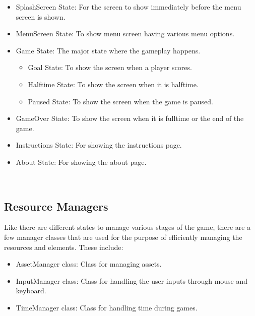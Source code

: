 \documentclass[main]{subfiles}
\begin{document}
\begin{itemize}
    \item SplashScreen State:
        For the screen to show immediately before the menu screen is shown.
    
    \item MenuScreen State:
        To show menu screen having various menu options.
    
    \item Game State:
        The major state where the gameplay happens.
        \begin{itemize}
            \item Goal State:
                To show the screen when a player scores.
                
            \item Halftime State:
                To show the screen when it is halftime.
            
            \item Paused State:
                To show the screen when the game is paused.
        \end{itemize}
    
    \item GameOver State:
        To show the screen when it is fulltime or the end of the game.
        
    \item Instructions State: 
        For showing the instructions page.
    
    \item About State:
        For showing the about page.
    
\end{itemize}\


\subsection{Resource Managers}
Like there are different states to manage various stages of the game, there are a few manager classes that are used for the purpose of efficiently managing the resources and elements. These include:
\begin{itemize}
    \item AssetManager class: 
        Class for managing assets.
 
    \item InputManager class: 
        Class for handling the user inputs through mouse and keyboard.
    
    \item TimeManager class: 
        Class for handling time during games.
\end{itemize}
\end{document}
